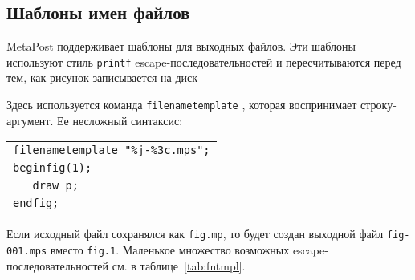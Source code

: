 \documentclass{article} %
\def\ttt{\texttt}  %
\begin{document}
\subsection{Шаблоны имен файлов}
\suppressfloats[t]

MetaPost поддерживает шаблоны для выходных файлов.
Эти шаблоны используют стиль \ttt{printf} escape-последовательностей 
и пересчитываются перед тем, как рисунок записывается на диск

Здесь используется команда \ttt{filenametemplate}%
\label{Dfilenametemplate},
которая воспринимает строку-аргумент.
Ее несложный синтаксис:

\begin{center}\begin{tabular}{l}
\verb|filenametemplate "%j-%3c.mps";|\\
\verb|beginfig(1);|\\
\verb|   draw p;|\\
\verb|endfig;|
\end{tabular}\end{center}

Если исходный файл сохранялся как \ttt{fig.mp}, то будет создан выходной файл 
\ttt{fig-001.mps} вместо \ttt{fig.1}. 
Маленькое множество возможных escape-последовательностей см. в 
таблице~\ref{tab:fntmpl}. 

\def\d{$\langle$0-9$\rangle$}
\end{document}
